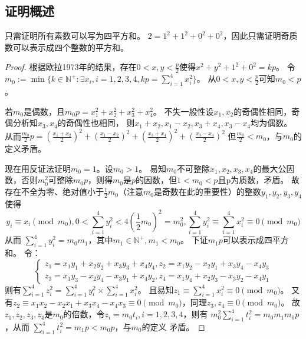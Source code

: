 \documentclass[main]{subfiles}
\begin{document}
\subsection{证明概述}
只需证明所有素数可以写为四平方和。
\(2=1^2 + 1^2 + 0^2 + 0^2\)，因此只需证明奇质数可以表示成四个整数的平方和。
\begin{proof}
	根据欧拉1973年的结果，存在\(0<x,y<\frac{p}{2} \)使得\(x^2 + y^2 + 1^2 + 0^2=kp\)。
	令\(m_0:=\min\{k \in \mathbb{N}^+:\exists x_i,i=1,2,3,4,kp=\sum_{i=1}^{4}x_i^2\}\)。
	从\(0<x,y<\frac{p}{2}\)可知\(m_0 < p\)。

	若\(m_0\)是偶数，且\(m_0 p = x_1^2 + x_2^2 + x_3^2 + x_4^2\)。
	不失一般性设\(x_1,x_2\)的奇偶性相同，奇偶分析知\(x_3,x_4\)的奇偶性也相同，
	则\(x_1+x_2,x_1-x_2,x_3+x_4,x_3-x_4\)均为偶数。
	从而\(\frac{m_0}{2}p = \left(\frac{x_1+x_2}{2}\right)^2 + \left(\frac{x_1-x_2}{2}\right)^2 + \left(\frac{x_3+x_4}{2}\right)^2 + \left(\frac{x_3-x_4}{2}\right)^2\)
	但\(\frac{m_0}{2} < m_0\)，与\(m_0\)的定义矛盾。

	现在用反证法证明\(m_0 = 1\)。设\(m_0 > 1\)。
	易知\(m_0\)不可整除\(x_1,x_2,x_3,x_4\)的最大公因数，否则\(m_0^2\)可整除\(m_0 p\)，则得\(m_0\)是\(p\)的因数，但\(1 < m_0 < p\)且p为质数，矛盾。
	故存在不全为零、绝对值小于\(\frac{1}{2} m_0\)（注意\(m_0\)是奇数在此的重要性）的整数\(y_1,y_2,y_3,y_4\)使得
	\[
		y_i \equiv x_i \pmod{m_0},0 < \sum_{i=1}^{4} y_i^2 < 4 (\frac{1}{2} m_0 )^2 = m_0^2 ,\sum_{i=1}^{4} y_i^2 \equiv \sum_{i=1}^{4} x_i^2 \equiv 0 \pmod{m_0}
	\]
	从而 \(\sum_{i=1}^{4} y_i^2  = m_0 m_1\)，其中\(m_1 \in \mathbb{N}^+,m_1 < m_0\)。
	下证\(m_1 p\)可以表示成四平方和。
	令：
	\[
		\begin{cases}
			z_1=x_1 y_1 + x_2 y_2 + x_3 y_3 + x_4 y_4,z_2 = x_1 y_2 - x_2 y_1 + x_3 y_4 - x_4 y_3 \\
			z_3 = x_1 y_3 - x_2 y_4 -x_3 y_1 + x_4 y_2,z_4 = x_1 y_4 + x_2 y_3 -x_3 y_2 -x_4 y_1
		\end{cases}
	\]
	则有\(\sum_{i=1}^{4} z_i^2 = \sum_{i=1}^{4} y_i^2 \times \sum_{i=1}^{4} x_i^2\)。
	且易知\(z_1 \equiv \sum_{i=1}^{4}x_i^2 \equiv 0 \pmod{m_0}\)。
	又有\(z_2 \equiv x_1 x_2 - x_2 x_1 +x_3 x_4 - x_4 x_3 \equiv 0 \pmod{m_0}\)，同理\(z_3,z_4 \equiv 0 \pmod{m_0}\)。
	故\(z_1,z_2,z_3,z_4\)是\(m_0\)的倍数，令\(z_i = m_0 t_i,i=1,2,3,4\)，则有
	\(m_0^2 \sum_{i=1}^{4} t_i^2 = m_0 m_1 m_0 p\)，从而
	\(\sum_{i=1}^{4} t_i^2 = m_1 p < m_0 p\)，与\(m_0\)的定义
	矛盾。
\end{proof}
\end{document}
